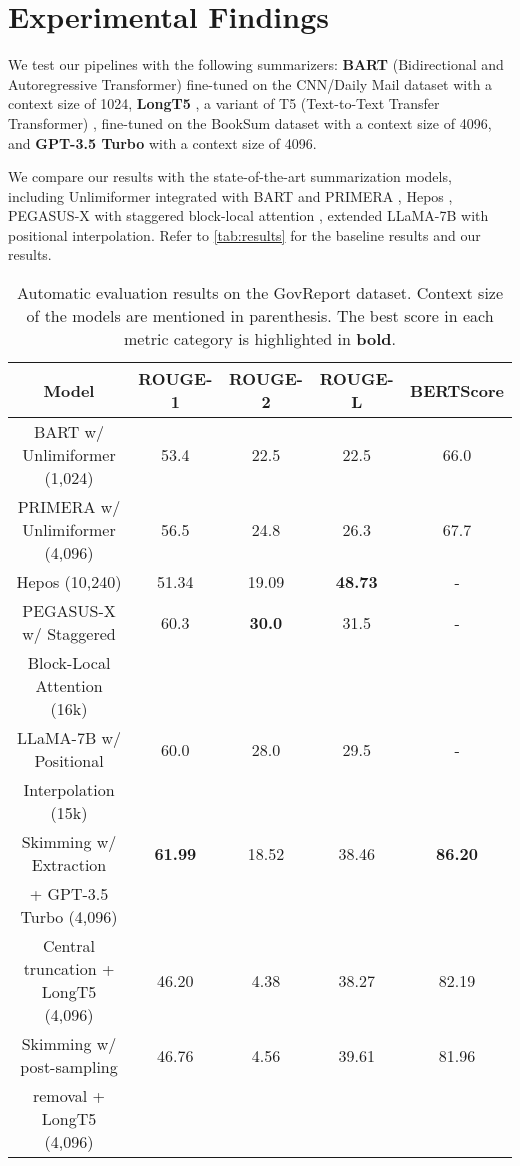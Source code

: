 \section{Experimental Findings}
\label{sec:findings}

We test our pipelines with the following summarizers: \textbf{BART} (Bidirectional
and Autoregressive Transformer) \cite{lewis-etal-2020-bart} fine-tuned on the
CNN/Daily Mail dataset \cite{nallapati2016abstractive} with a context size of 1024,
\textbf{LongT5} \cite{guo2021longt5}, a variant of T5 (Text-to-Text Transfer
Transformer) \cite{raffel2020exploring}, fine-tuned on the BookSum dataset with
a context size of 4096, and \textbf{GPT-3.5 Turbo} \cite{brown2020language} with a
context size of 4096.

We compare our results with the state-of-the-art summarization models, including
Unlimiformer \cite{bertsch2023unlimiformer} integrated with BART \cite{lewis-etal-2020-bart}
and PRIMERA \cite{beltagy2020longformer}, Hepos \cite{huang-etal-2021-efficient},
PEGASUS-X with staggered block-local attention \cite{phang2022investigating}, extended
LLaMA-7B with positional interpolation.
Refer to \autoref{tab:results} for the baseline results and our results.

\begin{table*}[!ht]
	\centering

	\begin{tabular}{c c c c c}
		\hline
		\textbf{Model} & \textbf{ROUGE-1} & \textbf{ROUGE-2} & \textbf{ROUGE-L} &
		\textbf{BERTScore} \\
		\hline
		BART w/ Unlimiformer (1,024) & 53.4 & 22.5 & 22.5 & 66.0 \\
		PRIMERA w/ Unlimiformer (4,096) & 56.5 & 24.8 & 26.3 & 67.7 \\
		Hepos (10,240) & 51.34 & 19.09 & \textbf{48.73} & - \\
		PEGASUS-X w/ Staggered & 60.3 & \textbf{30.0} & 31.5 & - \\
		Block-Local Attention (16k) & & & & \\
		LLaMA-7B w/ Positional & 60.0 & 28.0 & 29.5 & - \\
		Interpolation (15k) & & & & \\
		\hline
		Skimming w/ Extraction & \textbf{61.99} & 18.52 & 38.46 & \textbf{86.20} \\
		+ GPT-3.5 Turbo (4,096) & & & & \\
		Central truncation + LongT5 (4,096) & 46.20 & 4.38 & 38.27 & 82.19 \\
		Skimming w/ post-sampling & 46.76 & 4.56 & 39.61 & 81.96 \\
		removal + LongT5 (4,096) & & & & \\
		\hline
	\end{tabular}

	\caption{Automatic evaluation results on the GovReport dataset. Context size of the models are
	mentioned in parenthesis. The best score in each metric category is highlighted in \textbf{bold}.}
	\label{tab:results}
\end{table*}
